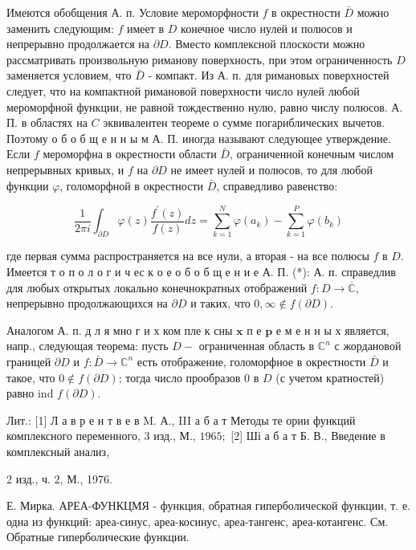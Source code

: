 \documentclass[10pt]{article}
\begin{document}
Имеются обобщения А. п. Условие мероморфности $f$ в окрестности $\bar{D}$ можно заменить следующим: $f$ имеет в $D$ конечное число нулей и полюсов и непрерывно продолжается на $\partial D$. Вместо комплексной плоскости можно рассматривать произвольную риманову поверхность, при этом ограниченность $D$ заменяется условием, что $\bar{D}$ - компакт. Из А. п. для римановых поверхностей следует, что на компактной римановой поверхности число нулей любой мероморфной функции, не равной тождественно нулю, равно числу полюсов. А. П. в областях на $C$ эквивалентен теореме о сумме погариблических вычетов. Поэтому о б о б щ е н н ы м А. П. иногда называют следующее утверждение. Если $f$ мероморфна в окрестности области $\bar{D}$, ограниченной конечным числом непрерывных кривых, и $f$ на $\partial D$ не имеет нулей и полюсов, то для любой функции $\varphi$, голоморфной в окрестности $\bar{D}$, справедливо равенство:



\[

\frac{1}{2 \pi i} \int_{\partial D} \varphi(z) \frac{f^{\prime}(z)}{f(z)} d z=\sum_{k=1}^{N} \varphi\left(a_{k}\right)-\sum_{k=1}^{P} \varphi\left(b_{k}\right)

\]



где первая сумма распространяется на все нули, а вторая - на все полюсы $f$ в $D$. Имеется т о п о л о г и ч ес к о е о б о б щ е н и е А. П. (*): А. п. справедлив для любых открытых локально конечнократных отображений $f: D \rightarrow \overline{\mathbb{C}}$, непрерывно продолжающихся на $\partial D$ и таких, что $0, \infty \notin f(\partial D)$.



Аналогом А. п. д л я мно г и х ком пле к сны $\mathbf{x}$ п е $\mathbf{p}$ е м е н н ы х является, напр., следующая теорема: пусть $D-$ ограниченная область в $\mathbb{C}^{n}$ с жордановой границей $\partial D$ и $f: \bar{D} \rightarrow \mathbb{C}^{n}$ есть отображение, голоморфное в окрестности $\bar{D}$ и такое, что $0 \notin f(\partial D)$; тогда число прообразов 0 в $D$ (с учетом кратностей) равно ind $f(\partial D)$.



Лит.: [1] Л а в р е н т в е в M. А., III а б а т Методы те ории функций комплексного переменного, 3 изд., М., $1965 ;$ [2] Ші а б а т Б. В., Введение в комплексный анализ,

2 изд., ч. 2, М., 1976.

Е. Мирка. АРЕА-ФУНКЦМЯ - функция, обратная гиперболической функции, т. е. одна из функций: ареа-синус, ареа-косинус, ареа-тангенс, ареа-котангенс. См. Обратные гиперболические функции.
\end{document}
